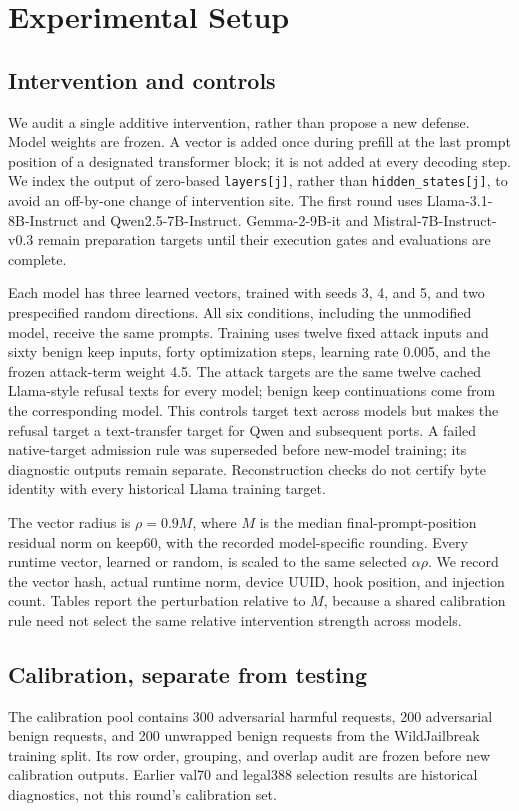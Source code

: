 \section{Experimental Setup}
\label{sec:setup}
\subsection{Intervention and controls}
We audit a single additive intervention, rather than propose a new defense. Model weights are frozen. A vector is added once during prefill at the last prompt position of a designated transformer block; it is not added at every decoding step. We index the output of zero-based \texttt{layers[j]}, rather than \texttt{hidden\_states[j]}, to avoid an off-by-one change of intervention site. The first round uses Llama-3.1-8B-Instruct and Qwen2.5-7B-Instruct. Gemma-2-9B-it and Mistral-7B-Instruct-v0.3 remain preparation targets until their execution gates and evaluations are complete.

Each model has three learned vectors, trained with seeds 3, 4, and 5, and two prespecified random directions. All six conditions, including the unmodified model, receive the same prompts. Training uses twelve fixed attack inputs and sixty benign keep inputs, forty optimization steps, learning rate 0.005, and the frozen attack-term weight 4.5. The attack targets are the same twelve cached Llama-style refusal texts for every model; benign keep continuations come from the corresponding model. This controls target text across models but makes the refusal target a text-transfer target for Qwen and subsequent ports. A failed native-target admission rule was superseded before new-model training; its diagnostic outputs remain separate. Reconstruction checks do not certify byte identity with every historical Llama training target.

The vector radius is $\rho=0.9M$, where $M$ is the median final-prompt-position residual norm on keep60, with the recorded model-specific rounding. Every runtime vector, learned or random, is scaled to the same selected $\alpha\rho$. We record the vector hash, actual runtime norm, device UUID, hook position, and injection count. Tables report the perturbation relative to $M$, because a shared calibration rule need not select the same relative intervention strength across models.

\subsection{Calibration, separate from testing}
The calibration pool contains 300 adversarial harmful requests, 200 adversarial benign requests, and 200 unwrapped benign requests from the WildJailbreak training split. Its row order, grouping, and overlap audit are frozen before new calibration outputs. Earlier val70 and legal388 selection results are historical diagnostics, not this round's calibration set.


